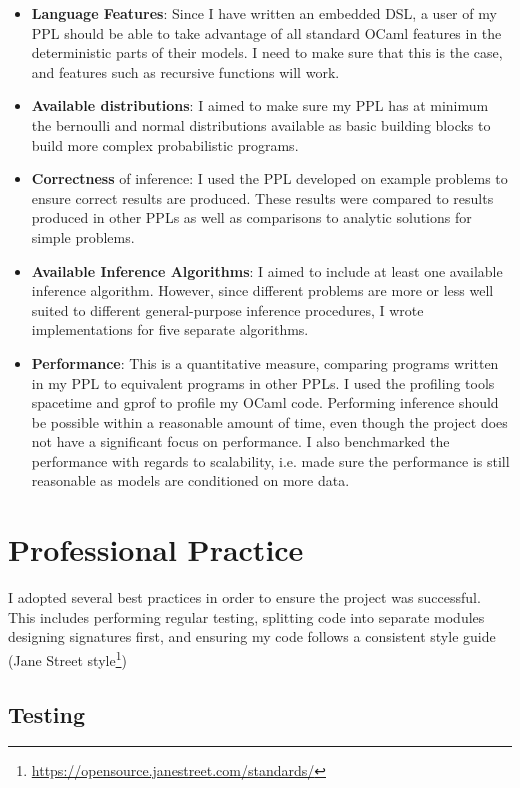 \begin{itemize}
    \item \textbf{Language Features}: Since I have written an embedded DSL, a user of my PPL should be able to take advantage of all standard OCaml features in the deterministic parts of their models. I need to make sure that this is the case, and features such as recursive functions will work.
    \item \textbf{Available distributions}: I aimed to make sure my PPL has at minimum the bernoulli and normal distributions available as basic building blocks to build more complex probabilistic programs.
    \item \textbf{Correctness} of inference: I used the PPL developed on example problems to ensure correct results are produced. These results were compared to results produced in other PPLs as well as comparisons to analytic solutions for simple problems.
    \item \textbf{Available Inference Algorithms}: I aimed to include at least one available inference algorithm. However, since different problems are more or less well suited to different general-purpose inference procedures, I wrote implementations for five separate algorithms.
    \item \textbf{Performance}: This is a quantitative measure, comparing programs written in my PPL to equivalent programs in other PPLs. I used the profiling tools spacetime and gprof to profile my OCaml code. Performing inference should be possible within a reasonable amount of time, even though the project does not have a significant focus on performance. I also benchmarked the performance with regards to scalability, i.e. made sure the performance is still reasonable as models are conditioned on more data.
\end{itemize}

\section{Professional Practice}

I adopted several best practices in order to ensure the project was successful. This includes performing regular testing, splitting code into separate modules designing signatures first, and ensuring my code follows a consistent style guide (Jane Street style\footnote{\url{https://opensource.janestreet.com/standards/}})

\subsection{Testing}

